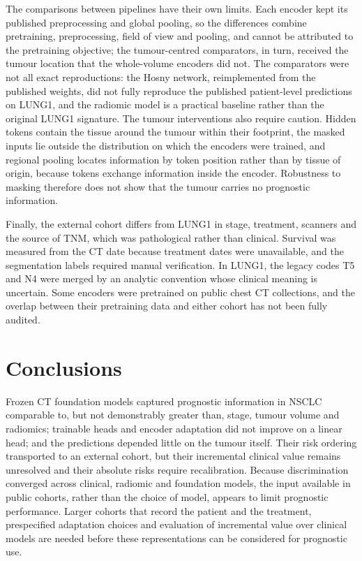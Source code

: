 The comparisons between pipelines have their own limits. Each encoder kept its published preprocessing and global pooling, so the differences combine pretraining, preprocessing, field of view and pooling, and cannot be attributed to the pretraining objective; the tumour-centred comparators, in turn, received the tumour location that the whole-volume encoders did not. The comparators were not all exact reproductions: the Hosny network, reimplemented from the published weights, did not fully reproduce the published patient-level predictions on LUNG1, and the radiomic model is a practical baseline rather than the original LUNG1 signature. The tumour interventions also require caution. Hidden tokens contain the tissue around the tumour within their footprint, the masked inputs lie outside the distribution on which the encoders were trained, and regional pooling locates information by token position rather than by tissue of origin, because tokens exchange information inside the encoder. Robustness to masking therefore does not show that the tumour carries no prognostic information.

Finally, the external cohort differs from LUNG1 in stage, treatment, scanners and the source of TNM, which was pathological rather than clinical. Survival was measured from the CT date because treatment dates were unavailable, and the segmentation labels required manual verification. In LUNG1, the legacy codes T5 and N4 were merged by an analytic convention whose clinical meaning is uncertain. Some encoders were pretrained on public chest CT collections, and the overlap between their pretraining data and either cohort has not been fully audited.

\section{Conclusions}\label{sec:conclusions}
Frozen CT foundation models captured prognostic information in NSCLC comparable to, but not demonstrably greater than, stage, tumour volume and radiomics; trainable heads and encoder adaptation did not improve on a linear head; and the predictions depended little on the tumour itself. Their risk ordering transported to an external cohort, but their incremental clinical value remains unresolved and their absolute risks require recalibration. Because discrimination converged across clinical, radiomic and foundation models, the input available in public cohorts, rather than the choice of model, appears to limit prognostic performance. Larger cohorts that record the patient and the treatment, prespecified adaptation choices and evaluation of incremental value over clinical models are needed before these representations can be considered for prognostic use.

